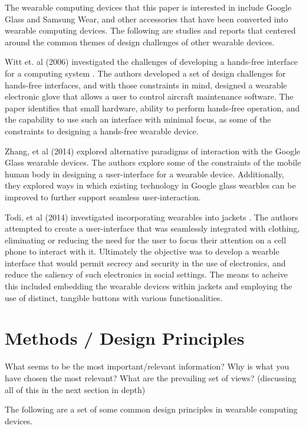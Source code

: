 \documentclass[12pt]{article}
\begin{document}
The wearable computing devices that this paper is interested in include Google Glass and Samsung Wear, and other accessories that have been converted into wearable computing devices. The following are studies and reports that centered around the common themes of design challenges of other wearable devices.

Witt et. al (2006) investigated the challenges of developing a hands-free interface for a computing system \cite{witt}. The authors developed a set of design challenges for hands-free interfaces, and with those constraints in mind, designed a wearable electronic glove that allows a user to control aircraft maintenance software. The paper identifies that small hardware, ability to perform hands-free operation, and the capability to use such an interface with minimal focus, as some of the constraints to designing a hands-free wearable device.

Zhang, et al (2014) explored alternative paradigms of interaction with the Google Glass wearable devices. The authors explore some of the constraints of the mobile human body in designing a user-interface for a wearable device. Additionally, they explored ways in which existing technology in Google glass wearbles can be improved to further support seamless user-interaction. 

Todi, et al (2014) investigated incorporating wearables into jackets \cite{todi}. The authors attempted to create a user-interface that was seamlessly integrated with clothing, eliminating or reducing the need for the user to focus their attention on a cell phone to interact with it. Ultimately the objective was to develop a wearble interface that would permit secrecy and security in the use of electronics, and reduce the saliency of such electronics in social settings.  The means to acheive this included embedding the wearable devices within jackets and employing the use of distinct, tangible buttons with various functionalities.

\section{Methods / Design Principles} 
What seems to be the most important/relevant information? Why is what you have chosen the most relevant? What are the prevailing set of views? (discussing all of this in the next section in depth) 

The following are a set of some common design principles in wearable computing devices.
\end{document}
